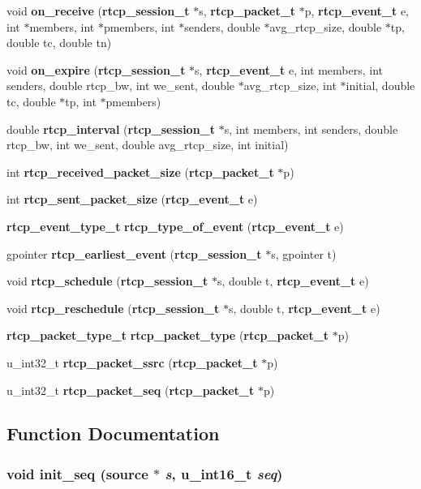 \begin{CompactItemize}
\item 
void {\bf on\_\-receive} ({\bf rtcp\_\-session\_\-t} $\ast$s, {\bf rtcp\_\-packet\_\-t} $\ast$p, {\bf rtcp\_\-event\_\-t} e, int $\ast$members, int $\ast$pmembers, int $\ast$senders, double $\ast$avg\_\-rtcp\_\-size, double $\ast$tp, double tc, double tn)
\item 
void {\bf on\_\-expire} ({\bf rtcp\_\-session\_\-t} $\ast$s, {\bf rtcp\_\-event\_\-t} e, int members, int senders, double rtcp\_\-bw, int we\_\-sent, double $\ast$avg\_\-rtcp\_\-size, int $\ast$initial, double tc, double $\ast$tp, int $\ast$pmembers)
\item 
double {\bf rtcp\_\-interval} ({\bf rtcp\_\-session\_\-t} $\ast$s, int members, int senders, double rtcp\_\-bw, int we\_\-sent, double avg\_\-rtcp\_\-size, int initial)
\item 
int {\bf rtcp\_\-received\_\-packet\_\-size} ({\bf rtcp\_\-packet\_\-t} $\ast$p)
\item 
int {\bf rtcp\_\-sent\_\-packet\_\-size} ({\bf rtcp\_\-event\_\-t} e)
\item 
{\bf rtcp\_\-event\_\-type\_\-t} {\bf rtcp\_\-type\_\-of\_\-event} ({\bf rtcp\_\-event\_\-t} e)
\item 
gpointer {\bf rtcp\_\-earliest\_\-event} ({\bf rtcp\_\-session\_\-t} $\ast$s, gpointer t)
\item 
void {\bf rtcp\_\-schedule} ({\bf rtcp\_\-session\_\-t} $\ast$s, double t, {\bf rtcp\_\-event\_\-t} e)
\item 
void {\bf rtcp\_\-reschedule} ({\bf rtcp\_\-session\_\-t} $\ast$s, double t, {\bf rtcp\_\-event\_\-t} e)
\item 
{\bf rtcp\_\-packet\_\-type\_\-t} {\bf rtcp\_\-packet\_\-type} ({\bf rtcp\_\-packet\_\-t} $\ast$p)
\item 
u\_\-int32\_\-t {\bf rtcp\_\-packet\_\-ssrc} ({\bf rtcp\_\-packet\_\-t} $\ast$p)
\item 
u\_\-int32\_\-t {\bf rtcp\_\-packet\_\-seq} ({\bf rtcp\_\-packet\_\-t} $\ast$p)
\end{CompactItemize}


\subsection{Function Documentation}
\subsubsection{\setlength{\rightskip}{0pt plus 5cm}void init\_\-seq ({\bf source} $\ast$ {\em s}, u\_\-int16\_\-t {\em seq})\hspace{0.3cm}{\tt  [static]}}\label{rtcp_8c_a13}


